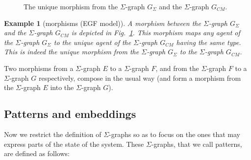 \documentclass{entcs}
\newcommand{\graphsymb}{G}
\newtheorem{myexample}[thm]{Example}
\begin{document}
\begin{figure}[t]
\hfill{}\hfill\mbox{}
\caption{The unique morphism from the $\Sigma$-graph $\graphsymb_{\Sigma}$
and the $\Sigma$-graph $\graphsymb_{\textit{CM}}$.}
  \label{fig:egfr:embed}
\end{figure}
\begin{myexample}[morphisms (EGF model)]

A morphism between the $\Sigma$-graph $\graphsymb_{\Sigma}$ and the $\Sigma$-graph $\graphsymb_{\textit{CM}}$ is depicted in Fig.~\ref{fig:egfr:embed}. This morphism maps any agent of the $\Sigma$-graph
$\graphsymb_{\Sigma}$ to the unique agent of the $\Sigma$-graph $\graphsymb_{\textit{CM}}$ having the same type.
This is indeed the unique morphism from the  $\Sigma$-graph
$\graphsymb_{\Sigma}$ to the $\Sigma$-graph $\graphsymb_{\textit{CM}}$.
\end{myexample}


Two morphisms from a $\Sigma$-graph  $E$ to a $\Sigma$-graph $F$, and from the $\Sigma$-graph $F$ to a $\Sigma$-graph $G$ respectively, compose in the usual way (and form a morphism from the $\Sigma$-graph $E$ into the
$\Sigma$-graph  $G$).

\subsection{Patterns and embeddings}

Now we restrict the definition of $\Sigma$-graphs so as to
focus on the ones that may express parts of the state of the system.
These $\Sigma$-graphs, that we call patterns, are defined as follows:
\end{document}
